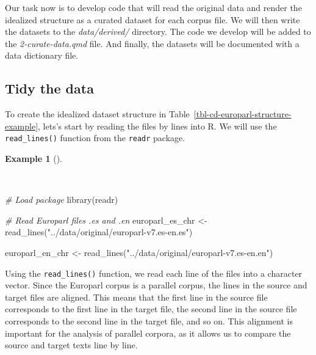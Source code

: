 \documentclass[
  letterpaper,
  DIV=11,
  numbers=noendperiod]{scrreprt}
\newenvironment{Shaded}{\begin{snugshade}}{\end{snugshade}}
\newcommand{\CommentTok}[1]{\textcolor[rgb]{0.00,0.00,0.00}{\textit{#1}}}
\newcommand{\FunctionTok}[1]{\textcolor[rgb]{0.00,0.00,0.00}{#1}}
\newcommand{\NormalTok}[1]{\textcolor[rgb]{0.00,0.00,0.00}{#1}}
\newcommand{\OtherTok}[1]{\textcolor[rgb]{0.00,0.00,0.00}{#1}}
\newcommand{\StringTok}[1]{\textcolor[rgb]{0.00,0.00,0.00}{#1}}
\theoremstyle{definition}
\newtheorem{example}{Example}[chapter]
\theoremstyle{remark}
\begin{document}
Our task now is to develop code that will read the original data and
render the idealized structure as a curated dataset for each corpus
file. We will then write the datasets to the \emph{data/derived/}
directory. The code we develop will be added to the
\emph{2-curate-data.qmd} file. And finally, the datasets will be
documented with a data dictionary file.

\subsection{Tidy the data}\label{tidy-the-data}

To create the idealized dataset structure in
Table~\ref{tbl-cd-europarl-structure-example}, lets's start by reading
the files by lines into R. We will use the \texttt{read\_lines()}
function from the \texttt{readr} package.

\begin{example}[]\protect\hypertarget{exm-cd-europarl-readr}{}\label{exm-cd-europarl-readr}

~

\begin{Shaded}
\begin{Highlighting}[]
\CommentTok{\# Load package}
\FunctionTok{library}\NormalTok{(readr)}

\CommentTok{\# Read Europarl files .es and .en}
\NormalTok{europarl\_es\_chr }\OtherTok{\textless{}{-}}
  \FunctionTok{read\_lines}\NormalTok{(}\StringTok{"../data/original/europarl{-}v7.es{-}en.es"}\NormalTok{)}

\NormalTok{europarl\_en\_chr }\OtherTok{\textless{}{-}}
  \FunctionTok{read\_lines}\NormalTok{(}\StringTok{"../data/original/europarl{-}v7.es{-}en.en"}\NormalTok{)}
\end{Highlighting}
\end{Shaded}

\end{example}

Using the \texttt{read\_lines()} function, we read each line of the
files into a character vector. Since the Europarl corpus is a parallel
corpus, the lines in the source and target files are aligned. This means
that the first line in the source file corresponds to the first line in
the target file, the second line in the source file corresponds to the
second line in the target file, and so on. This alignment is important
for the analysis of parallel corpora, as it allows us to compare the
source and target texts line by line.
\end{document}
